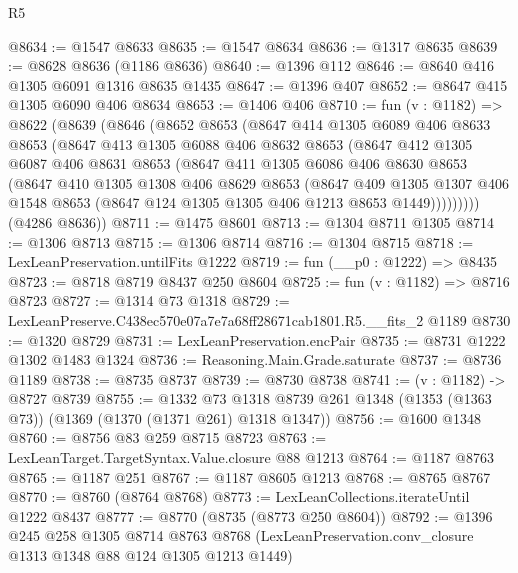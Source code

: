 \begin{lexlean}{R5}
\begin{coremodule}
@8634 := @1547 @8633
@8635 := @1547 @8634
@8636 := @1317 @8635
@8639 := @8628 @8636 (@1186 @8636)
@8640 := @1396 @112
@8646 := @8640 @416 @1305 @6091 @1316 @8635 @1435
@8647 := @1396 @407
@8652 := @8647 @415 @1305 @6090 @406 @8634
@8653 := @1406 @406
@8710 := fun (v : @1182) =>
  @8622
    (@8639
      (@8646
        (@8652
          @8653
          (@8647
            @414
            @1305
            @6089
            @406
            @8633
            @8653
            (@8647
              @413
              @1305
              @6088
              @406
              @8632
              @8653
              (@8647
                @412
                @1305
                @6087
                @406
                @8631
                @8653
                (@8647
                  @411
                  @1305
                  @6086
                  @406
                  @8630
                  @8653
                  (@8647
                    @410
                    @1305
                    @1308
                    @406
                    @8629
                    @8653
                    (@8647
                      @409
                      @1305
                      @1307
                      @406
                      @1548
                      @8653
                      (@8647 @124 @1305 @1305 @406 @1213 @8653 @1449)))))))))
      (@4286 @8636))
@8711 := @1475 @8601
@8713 := @1304 @8711 @1305
@8714 := @1306 @8713
@8715 := @1306 @8714
@8716 := @1304 @8715
@8718 := LexLeanPreservation.untilFits @1222
@8719 := fun (__p0 : @1222) => @8435
@8723 := @8718 @8719 @8437 @250 @8604
@8725 := fun (v : @1182) => @8716 @8723
@8727 := @1314 @73 @1318
@8729 := LexLeanPreserve.C438ec570e07a7e7a68ff28671cab1801.R5.__fits_2 @1189
@8730 := @1320 @8729
@8731 := LexLeanPreservation.encPair
@8735 := @8731 @1222 @1302 @1483 @1324
@8736 := Reasoning.Main.Grade.saturate
@8737 := @8736 @1189
@8738 := @8735 @8737
@8739 := @8730 @8738
@8741 := (v : @1182) -> @8727 @8739
@8755 := @1332
    @73
    @1318
    @8739
    @261
    @1348
    (@1353 (@1363 @73))
    (@1369 (@1370 (@1371 @261) @1318 @1347))
@8756 := @1600 @1348
@8760 := @8756 @83 @259 @8715 @8723
@8763 := LexLeanTarget.TargetSyntax.Value.closure @88 @1213
@8764 := @1187 @8763
@8765 := @1187 @251
@8767 := @1187 @8605 @1213
@8768 := @8765 @8767
@8770 := @8760 (@8764 @8768)
@8773 := LexLeanCollections.iterateUntil @1222 @8437
@8777 := @8770 (@8735 (@8773 @250 @8604))
@8792 := @1396
    @245
    @258
    @1305
    @8714
    @8763
    @8768
    (LexLeanPreservation.conv_closure @1313 @1348 @88 @124 @1305 @1213 @1449)

\end{coremodule}
\end{lexlean}
